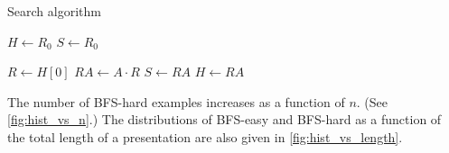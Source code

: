\begin{algorithm}
	\caption{Search algorithm}\label{alg:bfs}
	\begin{algorithmic}
		\State $H \gets R_0$ 
		\State $S \gets R_0$ 

		 
		\State $R \gets H[0]$ 
		\State $RA \gets A \cdot R$ 
		\State $S \gets RA$
		\State $H \gets RA$ 

		\EndIf
		\EndFor
		\EndWhile
	\end{algorithmic}
\end{algorithm}

The number of BFS-hard examples increases as a function of $n$.
(See \autoref{fig:hist_vs_n}.)
The distributions of BFS-easy and BFS-hard as a function of the total length of a presentation are also given in \autoref{fig:hist_vs_length}.

